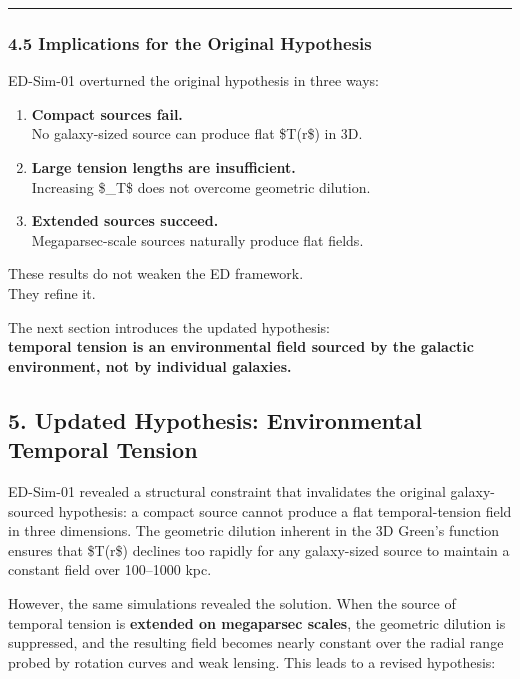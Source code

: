 \begin{center}\rule{0.5\linewidth}{0.5pt}\end{center}

\subsubsection{4.5 Implications for the Original
Hypothesis}\label{implications-for-the-original-hypothesis}

ED-Sim-01 overturned the original hypothesis in three ways:

\begin{enumerate}
\def\labelenumi{\arabic{enumi}.}
\item
  \textbf{Compact sources fail.}\\
  No galaxy-sized source can produce flat \$T(r\$) in 3D.
\item
  \textbf{Large tension lengths are insufficient.}\\
  Increasing \$\ell\_T\$ does not overcome geometric dilution.
\item
  \textbf{Extended sources succeed.}\\
  Megaparsec-scale sources naturally produce flat fields.
\end{enumerate}

These results do not weaken the ED framework.\\
They refine it.

The next section introduces the updated hypothesis:\\
\textbf{temporal tension is an environmental field sourced by the
galactic environment, not by individual galaxies.}

\subsection{5. Updated Hypothesis: Environmental Temporal
Tension}\label{updated-hypothesis-environmental-temporal-tension}

ED-Sim-01 revealed a structural constraint that invalidates the original
galaxy-sourced hypothesis: a compact source cannot produce a flat
temporal-tension field in three dimensions. The geometric dilution
inherent in the 3D Green's function ensures that \$T(r\$) declines too
rapidly for any galaxy-sized source to maintain a constant field over
100--1000 kpc.

However, the same simulations revealed the solution. When the source of
temporal tension is \textbf{extended on megaparsec scales}, the
geometric dilution is suppressed, and the resulting field becomes nearly
constant over the radial range probed by rotation curves and weak
lensing. This leads to a revised hypothesis:

